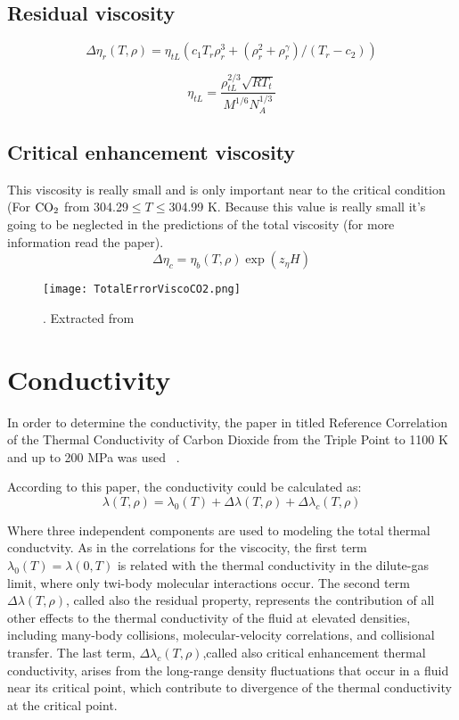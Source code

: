 \subsection{Residual viscosity}

\begin{equation}
    \Delta\eta_r(T,\rho) = \eta_{tL}(c_1T_r\rho_r^3 + (\rho_r^2 + \rho_r^\gamma)/(T_r -c_2))
	\label{ResidualViscosityEq}
\end{equation}

\begin{equation}
    \eta_{tL} = \frac{\rho_{tL}^{2/3} \sqrt{RT_t}}{M^{1/6}N_A^{1/3}}
\end{equation}

\subsection{Critical enhancement viscosity}
This viscosity is really small and is only important near to the critical condition (For $\ce{CO2}$ from 304.29$\leq T\leq$304.99 K. Because this value is really small it's going to be neglected in the predictions of the total viscosity (for more information read the paper). 
\begin{equation}
    \Delta\eta_c = \eta_b(T,\rho)\exp{\left(z_\eta H\right)}
\end{equation}


\begin{figure}[h!]
	\centering
	\texttt{[image: TotalErrorViscoCO2.png]}
	\caption{. Extracted
	from \cite{laesecke2017reference}}
\label{fig:TotalErrorViscoCO2}
\end{figure}


\section{Conductivity}
In order to determine the conductivity, the paper in titled Reference
Correlation of the Thermal Conductivity of Carbon Dioxide from the Triple Point
to 1100 K and up to 200 MPa was used ~\cite{}.

According to this paper, the conductivity could be calculated as:
\begin{equation}
    \lambda(T,\rho) = \lambda_0(T) + \Delta\lambda(T,\rho) + \Delta\lambda_c(T,\rho)    
\end{equation}

Where three independent components are used to modeling the total thermal
conductvity. As in the correlations for the viscocity, the first term
$\lambda_0(T) = \lambda(0,T)$ is related with the  thermal conductivity in the
dilute-gas limit, where only twi-body molecular interactions occur. The second
term $\Delta\lambda(T,\rho)$, called also the residual property, represents the
contribution of all other effects to the thermal conductivity of the fluid at
elevated densities, including many-body collisions, molecular-velocity
correlations, and collisional transfer. The last term,
$\Delta\lambda_c(T,\rho)$,called also critical enhancement thermal conductivity,
arises from the long-range density fluctuations that occur in a fluid near its
critical point, which contribute to divergence of the thermal conductivity at
the critical point. 

